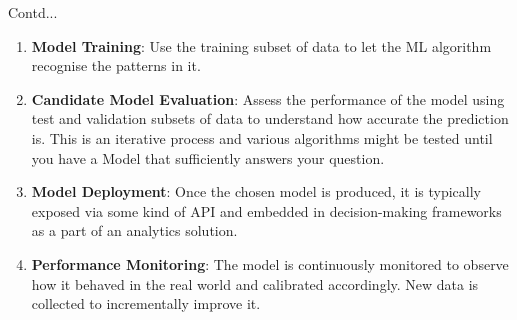 \documentclass{beamer}
\begin{document}
\begin{frame}{Contd...}
	\begin{enumerate}\addtocounter{enumi}{4}
		\item \textbf{Model Training}: Use the training subset of data to let the ML algorithm recognise the patterns in it.
		\item \textbf{Candidate Model Evaluation}: Assess the performance of the model using test and validation subsets of data to understand how accurate the prediction is. This is an iterative process and various algorithms might be tested until you have a Model that sufficiently answers your question.
		\item \textbf{Model Deployment}: Once the chosen model is produced, it is typically exposed via some kind of API and embedded in decision-making frameworks as a part of an analytics solution.
		\item \textbf{Performance Monitoring}: The model is continuously monitored to observe how it behaved in the real world and calibrated accordingly. New data is collected to incrementally improve it.
	\end{enumerate}
\end{frame}
\end{document}
